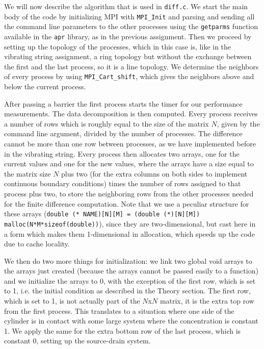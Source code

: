 \documentclass[11pt,a4paper,onecolumn]{article}
\begin{document}
We will now describe the algorithm that is used in \texttt{diff.c}. We start the main body of the code by initializing MPI with \texttt{MPI\_Init} and parsing and sending all the command line parameters to the other processes using the \texttt{getparms} function available in the \texttt{apr} library, as in the previous assignment. Then we proceed by setting up the topology of the processes, which in this case is, like in the vibrating string assignment, a ring topology but without the exchange between the first and the last process, so it is a line topology. We determine the neighbors of every process by using \texttt{MPI\_Cart\_shift}, which gives the neighbors above and below the current process. 

After passing a barrier the first process starts the timer for our performance measurements. The data decomposition is then computed. Every process receives a number of rows which is roughly equal to the size of the matrix $N$, given by the command line argument, divided by the number of processes. The difference cannot be more than one row between processes, as we have implemented before in the vibrating string. Every process then allocates two arrays, one for the current values and one for the new values, where the arrays have a size equal to the matrix size $N$ plus two (for the extra columns on both sides to implement continuous boundary conditions) times the number of rows assigned to that process plus two, to store the neighboring rows from the other processes needed for the finite difference computation. Note that we use a peculiar structure for these arrays (\texttt{double (* NAME)[N][M] = (double (*)[N][M]) malloc(N*M*sizeof(double))}), since they are two-dimensional, but cast here in a form which makes them 1-dimensional in allocation, which speeds up the code due to cache locality.

We then do two more things for initialization: we link two global void arrays to the arrays just created (because the arrays cannot be passed easily to a function) and we initialize the arrays to 0, with the exception of the first row, which is set to 1, i.e. the initial condition as described in the Theory section. The first row, which is set to 1, is not actually part of the $N$x$N$ matrix, it is the extra top row from the first process. This translates to a situation where one side of the cylinder is in contact with some large system where the concentration is constant 1. We apply the same for the extra bottom row of the last process, which is constant 0, setting up the source-drain system.
\end{document}
